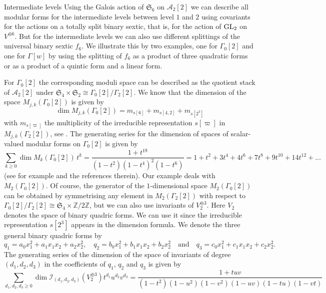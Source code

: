 \documentclass[12pt]{amsart}
\numberwithin{equation}{section}
\newcommand{\ZZ}{\mathbb Z}
\numberwithin{equation}{section}
\theoremstyle{definition}
\theoremstyle{remark}
\begin{document}
\begin{section}{Intermediate levels}
Using the Galois action of $\mathfrak{S}_6$ on $\mathcal{A}_2[2]$ we can describe all 
modular forms for the intermediate levels between level $1$ and $2$ using covariants
for the actions on a totally split binary sextic, that is, for the action of 
${\rm GL}_2$ on $V^{\oplus 6}$. But for the intermediate levels we can also use
different splittings of the universal binary sextic $f_6$.
We illustrate this by two examples, one for $\Gamma_0[2]$ and one for $\Gamma[w]$
by using the splitting of $f_6$ as a product of three quadratic forms or
as a product of a quintic form and a linear form.

For $\Gamma_0[2]$ the corresponding moduli space can be described as the quotient
stack of $\mathcal{A}_2[2]$ under $\mathfrak{S}_4 \times \mathfrak{S}_2\cong \Gamma_0[2]/\Gamma_2[2]$.
We know that the dimension of the space $M_{j,k}(\Gamma_0[2])$ is given by
\[
\dim M_{j,k}(\Gamma_0[2])=m_{s[6]}+m_{s[4,2]}+m_{s[2^3]}
\]
with $m_{s[\varpi]}$ the multiplicity of the irreducible representation $s[\varpi]$ in $M_{j,k}(\Gamma_2[2])$,
see \cite[Section 9]{CvdGG}.
The generating series
for the dimension of spaces of scalar-valued modular forms on $\Gamma_0[2]$ is given by
\[
\sum_{k \geqslant 0}\dim M_{k}(\Gamma_0[2])\,t^k
=\frac{1+t^{19}}{(1-t^2)(1-t^4)^2(1-t^6)}=1+t^{2}+3 t^{4}+4 t^{6}+7 t^{8}+9 t^{10}+14 t^{12}+\dots
\]
(see for example \cite[Remark 3.3]{BC} and the references therein). Our example
deals with $M_{2}(\Gamma_0[2])$. Of course,
the generator of the $1$-dimensional space
 $M_{2}(\Gamma_0[2])$ can be obtained by symmetrising any element in $M_{2}(\Gamma_2[2])$ 
with respect to $\Gamma_0[2]/\Gamma_2[2]\cong \mathfrak{S}_4\times \ZZ/2\ZZ$,
but we can also use invariants of $V_2^{\oplus 3}$. Here
 $V_2$ denotes the space of binary quadric forms. We can use it since the irreducible representation $s[2^3]$
appears in the dimension formula.  We denote the three 
general binary quadric forms by
 \[
 q_1=a_0x_1^2+a_1x_1x_2+a_2x_2^2, \quad  q_2=b_0x_1^2+b_1x_1x_2+b_2x_2^2 \quad \text{and} \quad  q_3=c_0x_1^2+c_1x_1x_2+c_2x_2^2.
 \]
The generating series of the dimension of the space of invariants of degree $(d_1,d_2,d_3)$ 
in the coefficients of $q_1$, $q_2$ and $q_3$ is given by
 \[
 \sum_{d_1,d_2,d_3\geqslant 0} \dim \mathcal{I}_{(d_1,d_2,d_3)}(V_2^{\oplus 3})t^{d_1}
u^{d_2}v^{d_3}= \frac{1+t u v }{\left(1-t^{2}\right) \left(1-u^{2}\right) \left(1-v^{2}\right) \left(1-u v \right) \left(1-t u \right) \left(1-v t \right)}
\]
\end{section}
\end{document}
